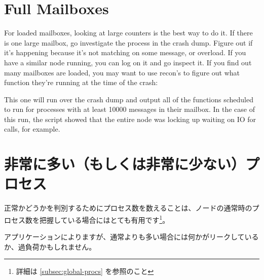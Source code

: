 \section{Full Mailboxes}
\label{sec:crash-full-mailboxes}

For loaded mailboxes, looking at large counters is the best way to do it. If there is one large mailbox, go investigate the process in the crash dump. Figure out if it's happening because it's not matching on some message, or overload. If you have a similar node running, you can log on it and go inspect it. If you find out many mailboxes are loaded, you may want to use recon's  to figure out what function they're running at the time of the crash:


This one will run over the crash dump and output all of the functions scheduled to run for processes with at least 10000 messages in their mailbox. In the case of this run, the script showed that the entire node was locking up waiting on IO for  calls, for example.

\section{非常に多い（もしくは非常に少ない）プロセス}

正常かどうかを判別するためにプロセス数を数えることは、ノードの通常時のプロセス数を把握している場合にはとても有用です\footnote{詳細は \ref{subsec:global-procs} を参照のこと}。

アプリケーションによりますが、通常よりも多い場合には何かがリークしているか、過負荷かもしれません。

